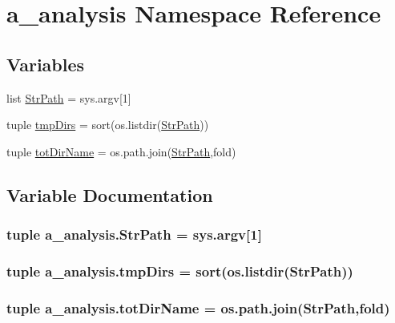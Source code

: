 \hypertarget{namespacea__analysis}{\section{a\-\_\-analysis Namespace Reference}
\label{namespacea__analysis}
}
\subsection*{Variables}
\begin{DoxyCompactItemize}
\item 
list \hyperlink{namespacea__analysis_ac05bc4d1e707f9745c6ca3818ae69bbc}{Str\-Path} = sys.\-argv\mbox{[}1\mbox{]}
\item 
tuple \hyperlink{namespacea__analysis_a710405f575ce0a834f2ac03121bd3fe5}{tmp\-Dirs} = sort(os.\-listdir(\hyperlink{namespacea__analysis_ac05bc4d1e707f9745c6ca3818ae69bbc}{Str\-Path}))
\item 
tuple \hyperlink{namespacea__analysis_a1a2c69442f4c13f10a07996864d5fe99}{tot\-Dir\-Name} = os.\-path.\-join(\hyperlink{namespacea__analysis_ac05bc4d1e707f9745c6ca3818ae69bbc}{Str\-Path},fold)
\end{DoxyCompactItemize}


\subsection{Variable Documentation}
\hypertarget{namespacea__analysis_ac05bc4d1e707f9745c6ca3818ae69bbc}{
\subsubsection[{Str\-Path}]{\setlength{\rightskip}{0pt plus 5cm}tuple a\-\_\-analysis.\-Str\-Path = sys.\-argv\mbox{[}1\mbox{]}}}\label{namespacea__analysis_ac05bc4d1e707f9745c6ca3818ae69bbc}
\hypertarget{namespacea__analysis_a710405f575ce0a834f2ac03121bd3fe5}{
\subsubsection[{tmp\-Dirs}]{\setlength{\rightskip}{0pt plus 5cm}tuple a\-\_\-analysis.\-tmp\-Dirs = sort(os.\-listdir({\bf Str\-Path}))}}\label{namespacea__analysis_a710405f575ce0a834f2ac03121bd3fe5}
\hypertarget{namespacea__analysis_a1a2c69442f4c13f10a07996864d5fe99}{
\subsubsection[{tot\-Dir\-Name}]{\setlength{\rightskip}{0pt plus 5cm}tuple a\-\_\-analysis.\-tot\-Dir\-Name = os.\-path.\-join({\bf Str\-Path},fold)}}\label{namespacea__analysis_a1a2c69442f4c13f10a07996864d5fe99}
